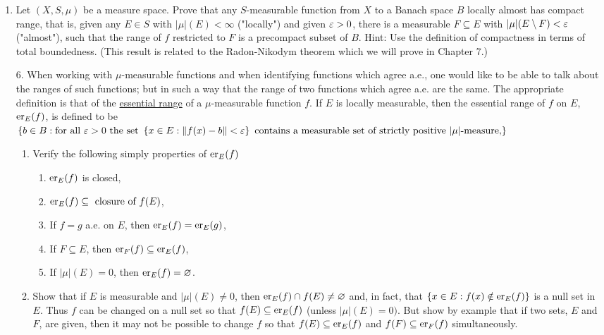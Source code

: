 \begin{enumerate}[label=\arabic*).]
\item Let $(X, S, \mu)$ be a measure space. Prove that any $S$-measurable function from $X$ to a Banach space $B$ locally almost has compact range, that is, given any $E \in S$ with $|\mu|(E)<\infty$ ("locally") and given $\ep>0$, there is a measurable $F \subseteq E$ with $|\mu|(E\sd F)<\ep$ ("almost"), such that the range of $f$ restricted to $F$ is a precompact subset of $B$. Hint: Use the definition of compactness in terms of total boundedness. (This result is related to the Radon-Nikodym theorem which we will prove in Chapter 7.)

6. When working with $\mu$-measurable functions and when identifying functions which agree a.e., one would like to be able to talk about the ranges of such functions; but in such a way that the range of two functions which agree a.e. are the same. The appropriate definition is that of the \underline{essential range} of a $\mu$-measurable function $f$. If $E$ is locally measurable, then the essential range of $f$ on $E$, $\er{f}{E}$, is defined to be $\brc{b \in B:\text{for all }\ep>0\text{ the set }\brc{x\in E:\norm{f(x)-b}<\ep}\text{ contains a measurable set of strictly positive }|\mu|\text{-measure,}}$
\begin{enumerate}
    \item Verify the following simply properties of $\er{f}{E}$
    \begin{enumerate}[label=\arabic*)]
        \item $\er{f}{E}$ is closed,
        \item $\er{f}{E}\subseteq\text{ closure of }f(E)$,
        \item If $f=g$ a.e. on $E$, then $\er{f}{E}=\er{g}{E}$,
        \item If $F \subseteq E$, then $\er{f}{F}\subseteq\er{f}{E}$,
        \item If $|\mu|(E)=0$, then $\er{f}{E}=\varnothing$.
    \end{enumerate}
    
    \item Show that if $E$ is measurable and $|\mu|(E)\neq 0$, then $\er{f}{E}\cap f(E)\neq\varnothing$ and, in fact, that $\brc{x \in E: f(x)\notin\er{f}{E}}$ is a null set in $E$. Thus $f$ can be changed on a null set so that $f(E) \subseteq\er{f}{E}$ (unless $|\mu|(E)=0)$. But show by example that if two sets, $E$ and $F$, are given, then it may not be possible to change $f$ so that $f(E)\subseteq\er{f}{E}$ and $f(F)\subseteq\er{f}{F}$ simultaneously.
    

\end{enumerate}
\end{enumerate}
